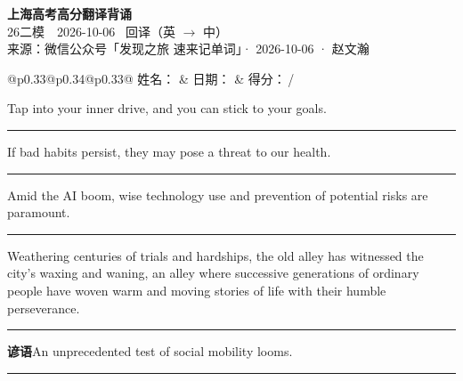 \documentclass[11pt,a4paper]{article}
\newcommand{\num}[1]{\makebox[1.9em][r]{#1.}\hspace{0.3em}}
\newcommand{\wline}{\noindent\rule{\linewidth}{0.4pt}}
\begin{document}
\pagestyle{plain}
\begin{center}
{\LARGE\bfseries 上海高考高分翻译背诵 }\\[0.25em]
{\large 26二模　2026-10-06 \quad\ 回译（英 $\to$ 中）}\\[0.35em]
{\footnotesize 来源：微信公众号「发现之旅 速来记单词」· 2026-10-06 · 赵文瀚}
\end{center}

\vspace{0.4em}
\noindent\begin{tabular}{@{}p{0.33\textwidth}@{}p{0.34\textwidth}@{}p{0.33\textwidth}@{}}
姓名：\underline{\hspace{2.0cm}} & 日期：\underline{\hspace{2.0cm}} & 得分：\underline{\hspace{1.4cm}}\,/ \\
\end{tabular}

\vspace{0.5em}

\vspace{0.8em}
\num{1}Tap into your inner drive, and you can stick to your goals.

\vspace{0.25em}

\wline

\num{2}If bad habits persist, they may pose a threat to our health.

\vspace{0.25em}

\wline

\num{3}Amid the AI boom, wise technology use and prevention of potential risks are paramount.

\vspace{0.25em}

\wline

\num{4}Weathering centuries of trials and hardships, the old alley has witnessed the city’s waxing and waning, an alley where successive generations of ordinary people have woven warm and moving stories of life with their humble perseverance.

\vspace{0.25em}

\wline

\vspace{0.4em}\noindent{\color{rulegray}\rule{\textwidth}{0.6pt}}\vspace{0.4em}

\num{5}\textbf{谚语}\quad An unprecedented test of social mobility looms.

\vspace{0.25em}

\wline
\end{document}
